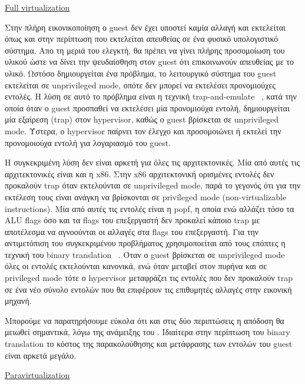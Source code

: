\vspace{2ex}
\underline{Full virtualization}

\vspace{1ex}

Στην πλήρη εικονικοποίηση ο guest δεν έχει υποστεί καμία αλλαγή και εκτελείται
όπως και στην περίπτωση που εκτελείται απευθείας σε ένα φυσικό υπολογιστικό
σύστημα. Απο τη μεριά του ελεγκτή, θα πρέπει να γίνει πλήρης προσομοίωση του
υλικού ώστε να δίνει την ψευδαίσθηση στον guest ότι επικοινωνούν απευθείας με το
υλικό. Ωστόσο δημιουργείται ένα πρόβλημα, το λειτουργικό σύστημα του guest
εκτελείται σε unprivileged mode, οπότε δεν μπορεί να εκτελέσει προνομιούχες
εντολές. Η λύση σε αυτό το πρόβλημα είναι η τεχνική trap-and-emulate
~\cite{adams2006comparison}, κατά την οποία όταν ο guest προσπαθεί να εκτελέσει
μία προνομιούχα εντολή, δημιουργείται μία εξαίρεση (trap) στον hypervisor, καθώς
ο guest βρίσκεται σε unprivileged mode. Ύστερα, ο hypervisor παίρνει τον έλεγχο
και προσομοιώνει ή εκτελεί την προνομοιούχα εντολή για λογαριασμό του guest. 

H συγκεκριμένη λύση δεν είναι αρκετή για όλες τις αρχιτεκτονικές. Μία από αυτές
τις αρχιτεκτονικές είναι και η x86. Στην x86 αρχιτεκτονική ορισμένες εντολές
δεν προκαλούν trap όταν εκτελούνται σε unprivileged mode, παρά το γεγονός ότι
για την εκτέλεση τους είναι ανάγκη να βρίσκονται σε privileged mode
(non-virtualizable instructions). Μία από
αυτές τις εντολές είναι η popf, η οποία ενώ αλλάζει τόσο τα ALU flags όσο και τα
flags του επεξεργαστή δεν προκαλεί κάποιο trap με αποτέλεσμα να αγνοούνται οι
αλλαγές στα flags του επεξεργαστή. Για την αντιμετόπιση του συγκεκριμένου
προβλήματος χρησιμοποείται από τους επόπτες η τεχνική του binary translation
~\cite{adams2006comparison}. 
Όταν ο guest βρίσκεται σε unprivileged mode όλες οι εντολές εκτελούνται
κανονικά, ενώ όταν μεταβεί στον πυρήνα και σε privileged mode τότε ο hypervisor
μεταφράζει τις εντολές που δεν προκαλούν trap σε ένα νέο σύνολο εντολών που θα
επιφέρουν τις επιθυμητές αλλαγές στην εικονική μηχανή. 

Μπορούμε να παρατηρήσουμε εύκολα ότι και στις δύο περιπτώσεις η απόδοση θα
μειωθεί σημαντικά, λόγω της ανάμειξης του . Ιδιαίτερα στην περίπτωση
του binary translation το κόστος της παρακολούθησης και μετάφρασης των εντολών
του guest είναι αρκετά μεγάλο. 

\vspace{2ex}
\underline{Paravirtualization}

\vspace{1ex}

